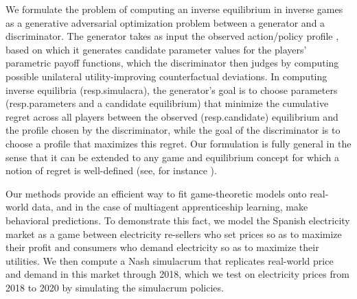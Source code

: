
We formulate the problem of computing an inverse equilibrium  in inverse games as a generative adversarial optimization problem between a generator and a discriminator.
The generator takes as input the observed action/policy profile , based on which it generates candidate parameter values  for the players' parametric payoff functions, which the discriminator then judges by computing possible unilateral utility-improving counterfactual deviations.
In computing inverse equilibria (resp.\@ simulacra), the generator's goal is to choose parameters (resp.\@ parameters and a candidate equilibrium) that minimize the cumulative regret across all players
between the observed (resp.\@ candidate) equilibrium and the profile chosen by the discriminator, while the goal of the discriminator is to choose a profile that maximizes this regret.
Our formulation is fully general in the sense that it can be extended to any game and equilibrium concept for which a notion of regret is well-defined (see, for instance \citep{morrill2022hindsight}).

Our methods provide an efficient way to fit game-theoretic models onto real-world data, and in the case of multiagent apprenticeship learning, make behavioral predictions. 
To demonstrate this fact, we model the Spanish electricity market as a game between electricity re-sellers who set prices so as to maximize their profit and consumers who demand electricity so as to maximize their utilities.
We then compute a Nash simulacrum that replicates real-world price and demand in this market through 2018, which we test on electricity prices from 2018 to 2020 by simulating the simulacrum policies.


